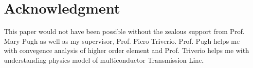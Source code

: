 \documentclass[journal]{IEEEtran}
\begin{document}
%


\section*{Acknowledgment}

This paper would not have been possible without the zealous support from Prof. Mary Pugh as well as my supervisor, Prof. Piero Triverio. Prof. Pugh helps me with convegence analysis of higher order element and Prof. Triverio helps me with understanding physics model of multiconductor Transmission Line. 


\ifCLASSOPTIONcaptionsoff
  \newpage
\fi




\end{document}
